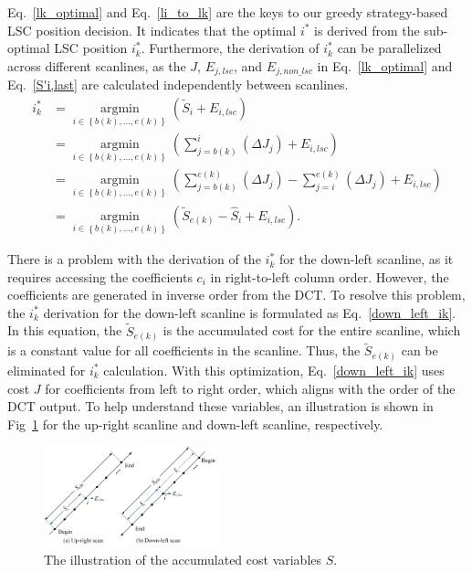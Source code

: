 \documentclass[lettersize,journal]{IEEEtran}
\begin{document}
Eq.~\eqref{lk_optimal} and Eq.~\eqref{li_to_lk} are the keys to our greedy strategy-based LSC position decision. It indicates that the optimal $i^{*}$ is derived from the sub-optimal LSC position $i_{k}^{*}$. Furthermore, the derivation of $i_{k}^{*}$ can be parallelized across different scanlines, as the $J$, $E_{j,lsc}$, and $E_{j,non\_lsc}$ in Eq.~\eqref{lk_optimal} and Eq.~\eqref{S'i,last} are calculated independently between scanlines. 
  \begin{equation}
      \begin{aligned}
      \label{down_left_ik}
    i_{k}^{*} 
    &=\mathop{\arg\min}\limits_{i \in \left \{ b(k),...,e(k)\right \} } \left ( \widetilde{S}_{i}+ E_{i,lsc} \right ) \\
    &=\mathop{\arg\min}\limits_{i \in \left \{ b(k),...,e(k)\right \} } \left ( \sum_{j=b(k)}^{i} \left ( \Delta J_{j} \right) + E_{i,lsc} \right ) \\
    &=\mathop{\arg\min}\limits_{i \in \left \{ b(k),...,e(k)\right \} } \left ( \sum_{j=b(k)}^{e(k)} \left ( \Delta J_{j} \right )  - \sum_{j=i}^{e(k)} \left ( \Delta J_{j} \right ) + E_{i,lsc} \right ) \\
    &=\mathop{\arg\min}\limits_{i \in \left \{ b(k),...,e(k)\right \} } \left ( \widetilde{S}_{e(k)} - \hat{S}_{i}  + E_{i,lsc} \right ) .
      \end{aligned}
  \end{equation}
\par
There is a problem with the derivation of the $i_{k}^{*}$ for the down-left scanline, as it requires accessing the coefficients $c_{i}$ in right-to-left column order. However, the coefficients are generated in inverse order from the DCT. To resolve this problem, the $i_{k}^{*}$ derivation for the down-left scanline is formulated as Eq.~\eqref{down_left_ik}. In this equation, the $\widetilde{S}_{e(k)}$ is the accumulated cost for the entire scanline, which is a constant value for all coefficients in the scanline. Thus, the $\widetilde{S}_{e(k)}$ can be eliminated for $i_{k}^{*}$ calculation. With this optimization, Eq.~\eqref{down_left_ik} uses cost $J$ for coefficients from left to right order, which aligns with the order of the DCT output. To help understand these variables, an illustration is shown in Fig~\ref{abcompare} for the up-right scanline and down-left scanline, respectively. 
\begin{figure}[!t]
	\centering
	\centerline{\includegraphics[width=0.45\textwidth]{figure/abcompare.png}} 
	\caption{The illustration of the accumulated cost variables $S$.}
	\label{abcompare} %
\end{figure}
\end{document}
